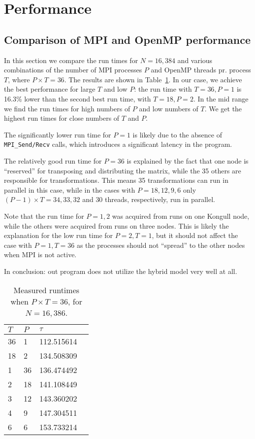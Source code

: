 \section{Performance} %
\label{sec:performance}

\subsection{Comparison of MPI and OpenMP performance} %
\label{sub:comparison_of_mpi_and_openmp_performance}
In this section we compare the run times for $N=16,384$ and various combinations of the number of MPI processes $P$ and OpenMP threads pr. process $T$, where $P\times T = 36$. The results are shown in Table~\ref{tab:runtimes_36}. In our case, we achieve the best performance for large $T$ and low $P$: the run time with $T=36, P=1$ is 16.3\% lower than the second best run time, with $T=18, P=2$. In the mid range we find the run times for high numbers of $P$ and low numbers of $T$. We get the highest run times for close numbers of $T$ and $P$.

The significantly lower run time for $P=1$ is likely due to the absence of \texttt{MPI\_Send/Recv} calls, which introduces a significant latency in the program.

The relatively good run time for $P=36$ is explained by the fact that one node is ``reserved'' for transposing and distributing the matrix, while the 35 others are responsible for transformations. This means 35 transformations can run in parallel in this case, while in the cases with $P=18,12,9,6$ only $(P-1)\times T = 34, 33, 32$ and $30$ threads, respectively, run in parallel.

Note that the run time for $P=1,2$ was acquired from runs on one Kongull node, while the others were acquired from runs on three nodes. This is likely the explanation for the low run time for $P=2, T=1$, but it should not affect the case with $P=1,T=36$ as the processes should not ``spread'' to the other nodes when MPI is not active.

In conclusion: out program does not utilize the hybrid model very well at all.

\begin{table}[H]
  \centering
  \caption{Measured runtimes when $P\times T = 36$, for $N=16,386$.}
  \label{tab:runtimes_36}
  \begin{tabularx}{0.5\textwidth}{XXXX}
    \toprule
    $T$ & $P$ & $\tau$ \\
    \midrule
    36  &  1  &  112.515614 \\
    18  &  2  &  134.508309 \\
    1   & 36  &  136.474492 \\
    2   & 18  &  141.108449 \\
    3   & 12  &  143.360202 \\
    4   &  9  &  147.304511 \\
    6   &  6  &  153.733214 \\
    \bottomrule
  \end{tabularx}
\end{table}

